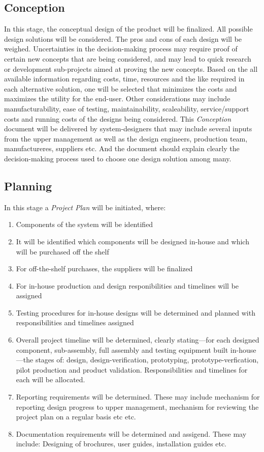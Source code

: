 \documentclass[a4paper,10pt]{article}
\makeatletter
\newcommand*{\etc}{%
    \@ifnextchar{.}%
        {etc}%
        {etc.\@\xspace}%
}
\makeatother
\begin{document}
\subsection{Conception}
In this stage, the conceptual design of the product will be finalized. All possible design solutions will be 
considered. The pros and cons of each design will be weighed. Uncertainties in the decision-making process
may require proof of certain new concepts that are being considered, and may lead to quick research 
or development sub-projects aimed at proving the new concepts. Based on the all available information regarding
costs, time, resources and the like required in each alternative solution, one will be selected that minimizes the costs and maximizes the utility for the end-user. 
Other considerations may include manufacturability, ease of testing, maintainability, scaleability,
service/support costs and running costs of the designs being considered. 
This \emph{Conception} document will be delivered by system-designers that may include several inputs from the 
upper management as well as the design engineers, production team, manufactureres, suppliers etc. And the document should explain clearly
the decision-making process used to choose one design solution among many.

\subsection{Planning}
In this stage a \emph{Project Plan} will be initiated, where:
\begin{enumerate}
 \item Components of the system will be identified
 \item It will be identified which components will be designed in-house and which will be purchased off the shelf
 \item For off-the-shelf purchases, the suppliers will be finalized 
 \item For in-house production and design responibilities and timelines will be assigned
 \item Testing procedures for in-house designs will be determined and planned with responsibilities and timelines assigned
 \item Overall project timeline will be determined, clearly stating---for each designed component, sub-assembly, full assembly and testing equipment built in-house---the stages of:
 design, design-verification, prototyping, prototype-verfication, pilot production and product validation. Responsibilities and timelines for each will be allocated.
 \item Reporting requirements will be determined. These may include mechanism for reporting design progress to upper management, 
 mechanism for reviewing the project plan on a regular basis \etc
 \item Documentation requirements will be determined and assigend. These may include: Designing of brochures, user guides, installation
 guides etc.
\end{enumerate}
\end{document}
